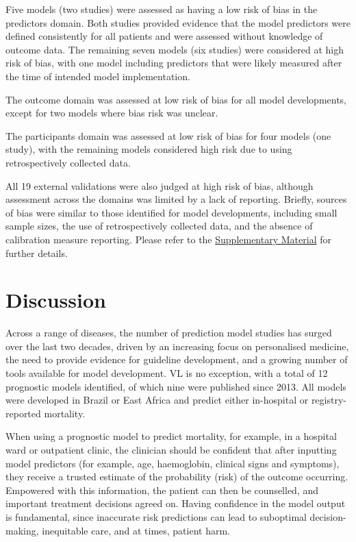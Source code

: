 Five models (two studies) were assessed as having a low risk of bias in the predictors domain\cite{abongomeraDevelopmentExternalValidation2017,costaPredictingDeathKalaazar2016}. Both studies provided evidence that the model predictors were defined consistently for all patients and were assessed without knowledge of outcome data. The remaining seven models (six studies) were considered at high risk of bias, with one model including predictors that were likely measured after the time of intended model implementation\cite{dearaujoEarlyClinicalManifestations2012}.

The outcome domain was assessed at low risk of bias for all model developments, except for two models where bias risk was unclear\cite{coura-vitalPrognosticFactorsScoring2014,dearaujoEarlyClinicalManifestations2012}.

The participants domain was assessed at low risk of bias for four models (one study)\cite{costaPredictingDeathKalaazar2016}, with the remaining models considered high risk due to using retrospectively collected data.

All 19 external validations were also judged at high risk of bias, although assessment across the domains was limited by a lack of reporting. Briefly, sources of bias were similar to those identified for model developments, including small sample sizes, the use of retrospectively collected data, and the absence of calibration measure reporting. Please refer to the \href{https://github.com/jpwil/dphil}{Supplementary Material} for further details.

\section{Discussion}

Across a range of diseases, the number of prediction model studies has surged over the last two decades, driven by an increasing focus on personalised medicine, the need to provide evidence for guideline development, and a growing number of tools available for model development\cite{peetluk2021,collins2024A,wesslerClinicalPredictionModels2015}. VL is no exception, with a total of 12 prognostic models identified, of which nine were published since 2013. All models were developed in Brazil or East Africa and predict either in-hospital or registry-reported mortality.

When using a prognostic model to predict mortality, for example, in a hospital ward or outpatient clinic, the clinician should be confident that after inputting model predictors (for example, age, haemoglobin, clinical signs and symptoms), they receive a trusted estimate of the probability (risk) of the outcome occurring. Empowered with this information, the patient can then be counselled, and important treatment decisions agreed on. Having confidence in the model output is fundamental, since inaccurate risk predictions can lead to suboptimal decision-making, inequitable care, and at times, patient harm.

